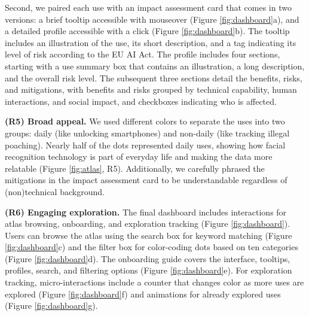 Second, we paired each use with an impact assessment card that comes in two versions: a brief tooltip accessible with mouseover (Figure \ref{fig:dashboard}a), and a detailed profile accessible with a click (Figure \ref{fig:dashboard}b). The tooltip includes an illustration of the use, its short description, and a tag indicating its level of risk according to the EU AI Act. The profile includes four sections, starting with a use summary box that contains an illustration, a long description, and the overall risk level. The subsequent three sections detail the benefits, risks, and mitigations, with benefits and risks grouped by technical capability, human interactions, and social impact, and checkboxes indicating who is affected.

\vspace{12pt}
\noindent\textbf{(R5) Broad appeal.} 
We used different colors to separate the uses into two groups: daily (like unlocking smartphones) and non-daily (like tracking illegal poaching). Nearly half of the dots represented daily uses, showing how facial recognition technology is part of everyday life and making the data more relatable (Figure \ref{fig:atlas}, R5). Additionally, we carefully phrased the mitigations in the impact assessment card to be understandable regardless of (non)technical background.

\smallskip
\noindent\textbf{(R6) Engaging exploration.} 
The final dashboard includes interactions for atlas browsing, onboarding, and exploration tracking (Figure \ref{fig:dashboard}). Users can browse the atlas using the search box for keyword matching (Figure \ref{fig:dashboard}c) and the filter box for color-coding dots based on ten categories (Figure \ref{fig:dashboard}d). The onboarding guide covers the interface, tooltips, profiles, search, and filtering options (Figure \ref{fig:dashboard}e). For exploration tracking, micro-interactions include a counter that changes color as more uses are explored (Figure \ref{fig:dashboard}f) and animations for already explored uses (Figure \ref{fig:dashboard}g). 